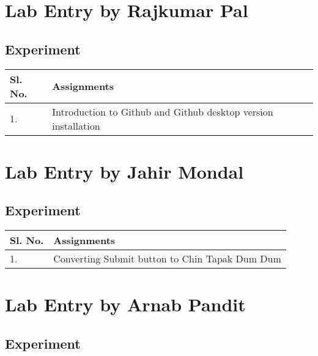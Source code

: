 \documentclass[a4paper,12pt]{article}
\begin{document}
\vspace{1.5cm}
\section{Lab Entry by Rajkumar Pal}

\vspace{0.7cm}
\subsection{Experiment}

\vspace{0.5cm}

\begin{table}[ht]
\centering
\begin{tabular}{|p{50pt}|p{200pt}|}
\hline
\textbf{Sl. No.} & \textbf{Assignments} \\ \hline
1. & Introduction to Github and Github desktop version installation \\ \hline
\end{tabular}
\end{table}

\section{Lab Entry by Jahir Mondal}
\subsection{Experiment}

\vspace{0.5cm}
\begin{table}[ht]
\centering
\begin{tabular}{|p{50pt}|p{200pt}|}
\hline
\textbf{Sl. No.} & \textbf{Assignments} \\ \hline
1. & Converting Submit button to Chin Tapak Dum Dum \\ \hline
\end{tabular}
\end{table}

\section{Lab Entry by Arnab Pandit}
\subsection{Experiment}
\end{document}
